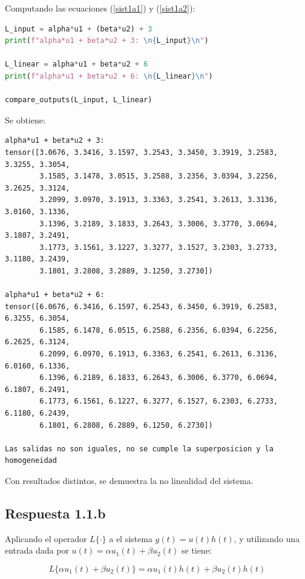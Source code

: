 \documentclass[12 pt]{article}
\begin{document}
\begin{enumerate}
Computando las ecuaciones (\ref{sist1a1}) y (\ref{sist1a2}):

\begin{lstlisting}[language=Python]
L_input = alpha*u1 + (beta*u2) + 3
print(f"alpha*u1 + beta*u2 + 3: \n{L_input}\n")

L_linear = alpha*u1 + beta*u2 + 6
print(f"alpha*u1 + beta*u2 + 6: \n{L_linear}\n")

compare_outputs(L_input, L_linear)
\end{lstlisting}

Se obtiene:

\begin{lstlisting}
alpha*u1 + beta*u2 + 3: 
tensor([3.0676, 3.3416, 3.1597, 3.2543, 3.3450, 3.3919, 3.2583, 3.3255, 3.3054,
        3.1585, 3.1478, 3.0515, 3.2588, 3.2356, 3.0394, 3.2256, 3.2625, 3.3124,
        3.2099, 3.0970, 3.1913, 3.3363, 3.2541, 3.2613, 3.3136, 3.0160, 3.1336,
        3.1396, 3.2189, 3.1833, 3.2643, 3.3006, 3.3770, 3.0694, 3.1807, 3.2491,
        3.1773, 3.1561, 3.1227, 3.3277, 3.1527, 3.2303, 3.2733, 3.1180, 3.2439,
        3.1801, 3.2808, 3.2889, 3.1250, 3.2730])

alpha*u1 + beta*u2 + 6: 
tensor([6.0676, 6.3416, 6.1597, 6.2543, 6.3450, 6.3919, 6.2583, 6.3255, 6.3054,
        6.1585, 6.1478, 6.0515, 6.2588, 6.2356, 6.0394, 6.2256, 6.2625, 6.3124,
        6.2099, 6.0970, 6.1913, 6.3363, 6.2541, 6.2613, 6.3136, 6.0160, 6.1336,
        6.1396, 6.2189, 6.1833, 6.2643, 6.3006, 6.3770, 6.0694, 6.1807, 6.2491,
        6.1773, 6.1561, 6.1227, 6.3277, 6.1527, 6.2303, 6.2733, 6.1180, 6.2439,
        6.1801, 6.2808, 6.2889, 6.1250, 6.2730])

Las salidas no son iguales, no se cumple la superposicion y la homogeneidad
\end{lstlisting}

Con resultados distintos, se demuestra la no linealidad del sistema.

\subsection{Respuesta 1.1.b}

Aplicando el operador ${L\{ \cdot \}}$ a el sistema ${g(t)=u(t)h(t)}$, y utilizando una entrada dada por ${u(t)=\alpha u_{1}(t) + \beta u_{2}(t)}$ se tiene:

\begin{equation}
\label{sist2a1}
    L\{ \alpha u_{1}(t) + \beta u_{2}(t) \} = \alpha u_{1}(t)h(t) + \beta u_{2}(t)h(t) 
\end{equation}


\end{enumerate}
\end{document}
